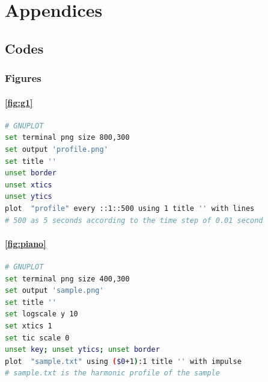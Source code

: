 \documentclass{book}
\begin{document}
\backmatter



\appendix
\renewcommand\thefigure{\thesection.\arabic{figure}}    
\setcounter{figure}{0}    
\chapter{Appendices}
\thispagestyle{empty}
\makeatletter
\setcounter{secnumdepth}{4}
\makeatother
\renewcommand{\thesection}{\Alph{section}}
\section{Codes}

\subsection{Figures}
\subsubsection{\ref{fig:g1}}
\label{an:pro}
\begin{lstlisting}[language=bash]
# GNUPLOT
set terminal png size 800,300 
set output 'profile.png' 
set title ''
unset border
unset xtics
unset ytics
plot  "profile" every ::1::500 using 1 title '' with lines 
# 500 as 5 seconds according to the time step of 0.01 second
\end{lstlisting}

\subsubsection{\ref{fig:piano}}
\label{an:pia}
\begin{lstlisting}[language=bash]
# GNUPLOT
set terminal png size 400,300 
set output 'sample.png' 
set title ''
set logscale y 10
set xtics 1
set tic scale 0
unset key; unset ytics; unset border 
plot  "sample.txt" using ($0+1):1 title '' with impulse
# sample.txt is the harmonic profile of the sample
\end{lstlisting}
\end{document}
